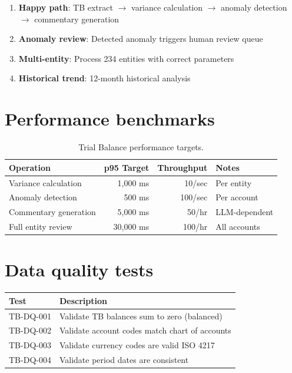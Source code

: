 \documentclass[11pt,a4paper,twoside]{report}
\begin{document}
\begin{enumerate}
\item \textbf{Happy path}: TB extract $\rightarrow$ variance calculation
$\rightarrow$ anomaly detection $\rightarrow$ commentary generation
\item \textbf{Anomaly review}: Detected anomaly triggers human review queue
\item \textbf{Multi-entity}: Process 234 entities with correct parameters
\item \textbf{Historical trend}: 12-month historical analysis
\end{enumerate}

\section{Performance benchmarks}

\begin{table}[htbp]
\centering
\caption{Trial Balance performance targets.}
\footnotesize
\begin{tabularx}{\linewidth}{@{}l r r X@{}}
\toprule
\textbf{Operation} & \textbf{p95 Target} & \textbf{Throughput} & \textbf{Notes} \\ \midrule
Variance calculation & 1,000 ms & 10/sec & Per entity \\
Anomaly detection & 500 ms & 100/sec & Per account \\
Commentary generation & 5,000 ms & 50/hr & LLM-dependent \\
Full entity review & 30,000 ms & 100/hr & All accounts \\
\bottomrule
\end{tabularx}
\end{table}

\section{Data quality tests}

\begin{tabularx}{\linewidth}{@{}l X@{}}
\toprule
\textbf{Test} & \textbf{Description} \\ \midrule
TB-DQ-001 & Validate TB balances sum to zero (balanced) \\
TB-DQ-002 & Validate account codes match chart of accounts \\
TB-DQ-003 & Validate currency codes are valid ISO 4217 \\
TB-DQ-004 & Validate period dates are consistent \\
\bottomrule
\end{tabularx}
\end{document}
